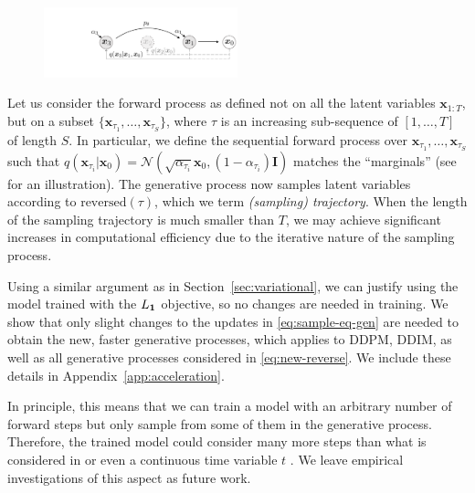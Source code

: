 \begin{figure}
\centering
\includegraphics[width=0.5\textwidth]{figures/diffusion-figure-acc.pdf}
\label{fig:diffusion-figure-acc}
\end{figure}

Let us consider the forward process as defined not on all the latent variables $\bm{x}_{1:T}$, but on a subset $\{\bm{x}_{\tau_1}, \ldots, \bm{x}_{\tau_S}\}$, where $\tau$ is an increasing sub-sequence of $[1, \ldots, T]$ of length $S$. 
In particular, we define the sequential forward process over $\bm{x}_{\tau_1}, \ldots, \bm{x}_{\tau_S}$ such that $q(\bm{x}_{\tau_i} | \bm{x}_0) = \mathcal{N}(\sqrt{\alpha_{\tau_i}} \bm{x}_0, (1 - \alpha_{\tau_i}) \bm{I})$ matches the ``marginals'' (see  for an illustration).
The generative process now samples latent variables according to $\text{reversed}(\tau)$, which we term \textit{(sampling) trajectory}. When the length of the sampling trajectory is much smaller than $T$, we may achieve
significant increases in computational efficiency due to the iterative nature of the sampling process. 

Using a similar argument as in Section~\ref{sec:variational}, we can justify using the model trained with the $L_{\bm{1}}$ objective, so no changes are needed in training. We show that only slight changes to the updates in \eqref{eq:sample-eq-gen} are needed to obtain the new, faster generative processes, which applies to DDPM, DDIM, as well as all generative processes considered in \eqref{eq:new-reverse}.
We include these details in Appendix~\ref{app:acceleration}.







In principle, this means that we can train a model with an arbitrary number of forward steps but only sample from some of them in the generative process. Therefore, the trained model could consider many more steps than what is considered in \citep{ho2020denoising} or even a continuous time variable $t$ \citep{chen2020wavegrad}. We leave empirical investigations of this aspect as future work.


